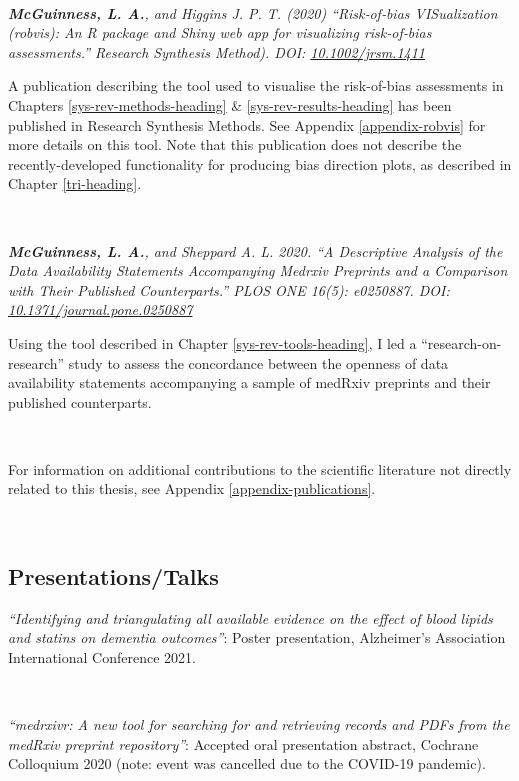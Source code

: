 \documentclass[a4paper, twoside]{templates/ociamthesis}
\begin{document}
~

\emph{\textbf{McGuinness, L. A.}, and Higgins J. P. T. (2020) ``Risk‐of‐bias VISualization (robvis): An R package and Shiny web app for visualizing risk‐of‐bias assessments.'' Research Synthesis Method). DOI: \href{https://doi.org/10.1002/jrsm.1411}{10.1002/jrsm.1411}}

A publication describing the tool used to visualise the risk-of-bias assessments in Chapters \ref{sys-rev-methods-heading} \& \ref{sys-rev-results-heading} has been published in Research Synthesis Methods. See Appendix \ref{appendix-robvis} for more details on this tool. Note that this publication does not describe the recently-developed functionality for producing bias direction plots, as described in Chapter \ref{tri-heading}.

~

\emph{\textbf{McGuinness, L. A.}, and Sheppard A. L. 2020. ``A Descriptive Analysis of the Data Availability Statements Accompanying Medrxiv Preprints and a Comparison with Their Published Counterparts.'' PLOS ONE 16(5): e0250887. DOI: \href{https://doi.org/10.1371/journal.pone.0250887}{10.1371/journal.pone.0250887}}

Using the tool described in Chapter \ref{sys-rev-tools-heading}, I led a ``research-on-research'' study to assess the concordance between the openness of data availability statements accompanying a sample of medRxiv preprints and their published counterparts.

~

For information on additional contributions to the scientific literature not directly related to this thesis, see Appendix \ref{appendix-publications}.

~

\hypertarget{presentationstalks}{%
\subsection{Presentations/Talks}\label{presentationstalks}}

\emph{``Identifying and triangulating all available evidence on the effect of blood lipids and statins on dementia outcomes''}: Poster presentation, Alzheimer's Association International Conference 2021.

~

\emph{``medrxivr: A new tool for searching for and retrieving records and PDFs from the medRxiv preprint repository''}: Accepted oral presentation abstract, Cochrane Colloquium 2020 (note: event was cancelled due to the COVID-19 pandemic).
\end{document}
